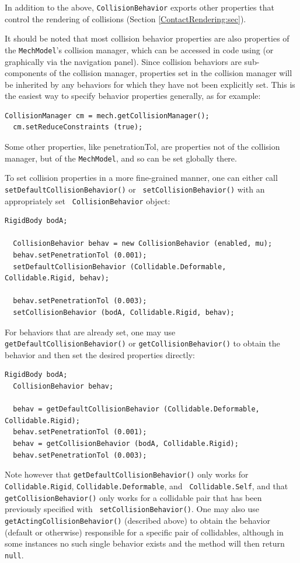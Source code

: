 In addition to the above, {\tt CollisionBehavior} exports other
properties that control the rendering of collisions (Section
\ref{ContactRendering:sec}).

It should be noted that most collision behavior properties are also
properties of the {\tt MechModel}'s collision manager, which can be
accessed in code using
(or graphically via the navigation panel).  Since collision behaviors
are sub-components of the collision manager, properties set in the
collision manager will be inherited by any behaviors for which they
have not been explicitly set. This is the easiest way to specify
behavior properties generally, as for example:
%
\begin{lstlisting}[]
  CollisionManager cm = mech.getCollisionManager();
  cm.setReduceConstraints (true);
\end{lstlisting}
%
Some other properties, like {\sf penetrationTol}, are properties not
of the collision manager, but of the {\tt MechModel}, and so can be
set globally there.

To set collision properties in a more fine-grained manner, one can
either call {\tt setDefaultCollisionBehavior()} or {\tt
setCollisionBehavior()} with an appropriately set {\tt
CollisionBehavior} object:
%
\begin{lstlisting}[]
  RigidBody bodA;

  CollisionBehavior behav = new CollisionBehavior (enabled, mu);
  behav.setPenetrationTol (0.001);
  setDefaultCollisionBehavior (Collidable.Deformable, Collidable.Rigid, behav);

  behav.setPenetrationTol (0.003);
  setCollisionBehavior (bodA, Collidable.Rigid, behav);
\end{lstlisting}
%
For behaviors that are already set, one may use {\tt
getDefaultCollisionBehavior()} or {\tt getCollisionBehavior()} to
obtain the behavior and then set the desired properties directly:
%
\begin{lstlisting}[]
  RigidBody bodA;
  CollisionBehavior behav;

  behav = getDefaultCollisionBehavior (Collidable.Deformable, Collidable.Rigid);
  behav.setPenetrationTol (0.001);
  behav = getCollisionBehavior (bodA, Collidable.Rigid);
  behav.setPenetrationTol (0.003);
\end{lstlisting}
%
Note however that {\tt getDefaultCollisionBehavior()} only works for
{\tt Collidable.Rigid}, {\tt Collidable.Deformable}, and {\tt
Collidable.Self}, and that {\tt getCollisionBehavior()} only works for
a collidable pair that has been previously specified with {\tt
setCollisionBehavior()}. One may also use {\tt
getActingCollisionBehavior()} (described above) to obtain the behavior
(default or otherwise) responsible for a specific pair of collidables,
although in some instances no such single behavior exists and the
method will then return {\tt null}.

